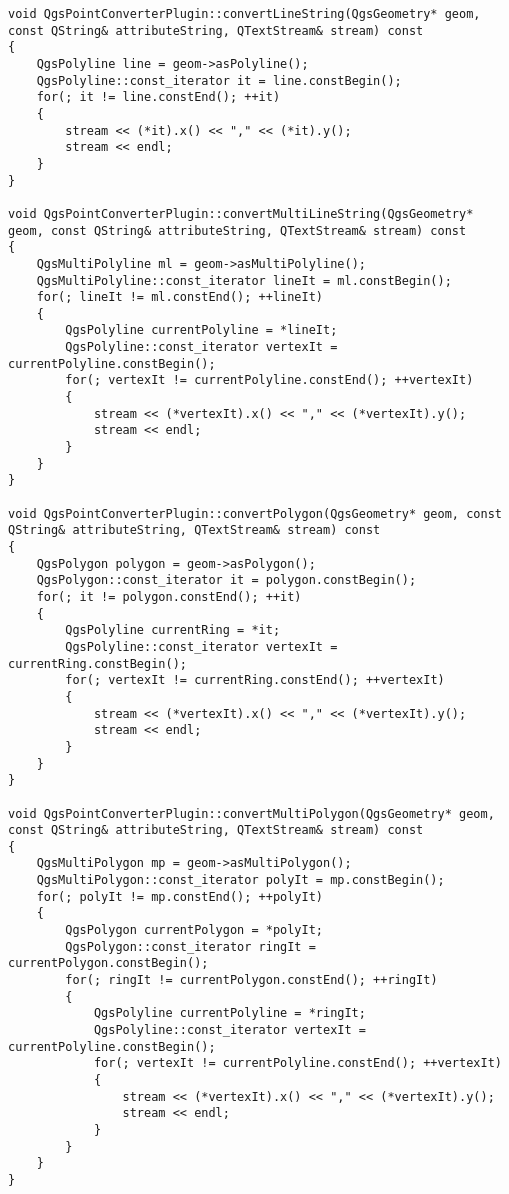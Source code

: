 \begin{verbatim}
void QgsPointConverterPlugin::convertLineString(QgsGeometry* geom, const QString& attributeString, QTextStream& stream) const
{
    QgsPolyline line = geom->asPolyline();
    QgsPolyline::const_iterator it = line.constBegin();
    for(; it != line.constEnd(); ++it)
    {
        stream << (*it).x() << "," << (*it).y();
        stream << endl;
    }
}

void QgsPointConverterPlugin::convertMultiLineString(QgsGeometry* geom, const QString& attributeString, QTextStream& stream) const
{
    QgsMultiPolyline ml = geom->asMultiPolyline();
    QgsMultiPolyline::const_iterator lineIt = ml.constBegin();
    for(; lineIt != ml.constEnd(); ++lineIt)
    {
        QgsPolyline currentPolyline = *lineIt;
        QgsPolyline::const_iterator vertexIt = currentPolyline.constBegin();
        for(; vertexIt != currentPolyline.constEnd(); ++vertexIt)
        {
            stream << (*vertexIt).x() << "," << (*vertexIt).y();
            stream << endl;
        }
    }
}

void QgsPointConverterPlugin::convertPolygon(QgsGeometry* geom, const QString& attributeString, QTextStream& stream) const
{
    QgsPolygon polygon = geom->asPolygon();
    QgsPolygon::const_iterator it = polygon.constBegin();
    for(; it != polygon.constEnd(); ++it)
    {
        QgsPolyline currentRing = *it;
        QgsPolyline::const_iterator vertexIt = currentRing.constBegin();
        for(; vertexIt != currentRing.constEnd(); ++vertexIt)
        {
            stream << (*vertexIt).x() << "," << (*vertexIt).y();
            stream << endl;
        }
    }
}

void QgsPointConverterPlugin::convertMultiPolygon(QgsGeometry* geom, const QString& attributeString, QTextStream& stream) const
{
    QgsMultiPolygon mp = geom->asMultiPolygon();
    QgsMultiPolygon::const_iterator polyIt = mp.constBegin();
    for(; polyIt != mp.constEnd(); ++polyIt)
    {
        QgsPolygon currentPolygon = *polyIt;
        QgsPolygon::const_iterator ringIt = currentPolygon.constBegin();
        for(; ringIt != currentPolygon.constEnd(); ++ringIt)
        {
            QgsPolyline currentPolyline = *ringIt;
            QgsPolyline::const_iterator vertexIt = currentPolyline.constBegin();
            for(; vertexIt != currentPolyline.constEnd(); ++vertexIt)
            {
                stream << (*vertexIt).x() << "," << (*vertexIt).y();
                stream << endl;
            }
        }
    }
}

\end{verbatim}




